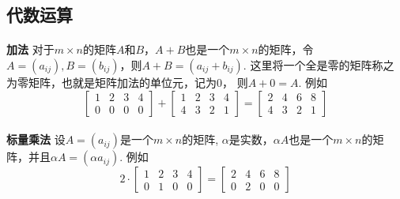 \subsection{代数运算}
\paragraph{}
\textbf{加法} \: 对于$m\times n$的矩阵$A$和$B$，$A + B$也是一个$m\times n$的矩阵，令$A = (a_{ij}), B = (b_{ij})$，则$A + B = (a_{ij} + b_{ij})$. 这里将一个全是零的矩阵称之为零矩阵，也就是矩阵加法的单位元，记为0， 则$A + 0 = A$.  例如
$$
 \begin{bmatrix}
    1 & 2 & 3 & 4 \\
    0 & 0 & 0 & 0 
  \end{bmatrix}  + 
  \begin{bmatrix}
    1 & 2 & 3 & 4 \\
    4 & 3 & 2 & 1 
  \end{bmatrix}  = 
  \begin{bmatrix}
    2 & 4 & 6 & 8 \\
    4 & 3 & 2 & 1 
  \end{bmatrix}
$$

\paragraph{}
\textbf{标量乘法} \: 设$A = (a_{ij})$是一个$m\times n$的矩阵, $\alpha$是实数，$\alpha A$也是一个$m\times n$的矩阵，并且$\alpha A = (\alpha a_{ij})$. 例如
$$
2 \cdot 
 \begin{bmatrix}
    1 & 2 & 3 & 4 \\
    0 & 1 & 0 & 0 
  \end{bmatrix}  = 
  \begin{bmatrix}
    2 & 4 & 6 & 8 \\
    0 & 2 & 0 & 0 
  \end{bmatrix}
$$

